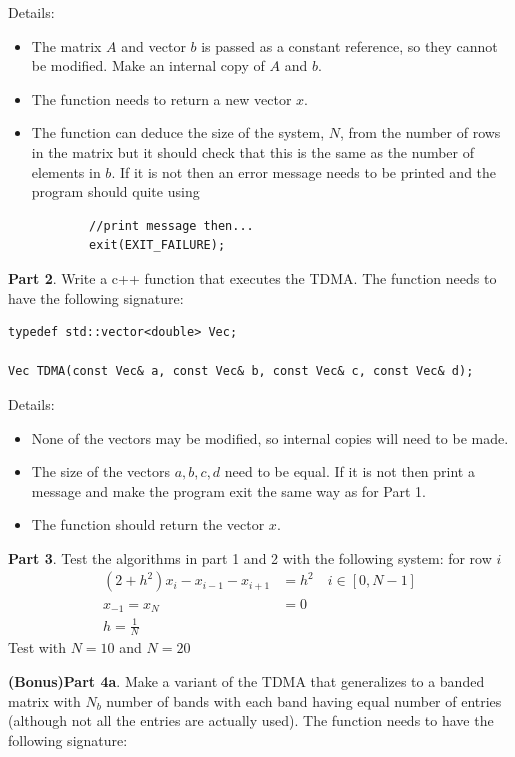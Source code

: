\documentclass[10pt,letterpaper,notitlepage]{article}
\newcommand{\beq}{\begin{equation*} \begin{aligned}}
\newcommand{\eeq}{\end{aligned}\end{equation*}}
\begin{document}
Details:
\begin{itemize}
	\item The matrix $A$ and vector $b$ is passed as a constant reference, so they cannot be modified. Make an internal copy of $A$ and $b$.
	\item The function needs to return a new vector $x$.
	\item The function can deduce the size of the system, $N$, from the number of rows
	in the matrix but it should check that this is the same as the number of elements in $b$. If it is not then an error message needs to be printed and the program should quite using 
	\begin{verbatim}
		//print message then...
		exit(EXIT_FAILURE);
	\end{verbatim}
\end{itemize}

\noindent
\textbf{Part 2}. Write a c++ function that executes the TDMA. The function needs to have the following signature:

\begin{verbatim}
typedef std::vector<double> Vec;

Vec TDMA(const Vec& a, const Vec& b, const Vec& c, const Vec& d);
\end{verbatim}

Details:
\begin{itemize}
	\item None of the vectors may be modified, so internal copies will need to be made.
	\item The size of the vectors $a,b,c,d$ need to be equal. If it is not then print a message and make the program exit the same way as for Part 1.
	\item The function should return the vector $x$.
\end{itemize}

\noindent
\textbf{Part 3}. Test the algorithms in part 1 and 2 with the following system:
for row $i$
\beq 
(2 + h^2)x_i - x_{i-1} - x_{i+1} &= h^2 \quad i\in [0,N-1]\\
x_{-1} = x_N &= 0\\
h = \frac{1}{N}
\eeq 
Test with $N=10$ and $N=20$

\vspace{1cm}
\noindent 
\textbf{(Bonus)Part 4a}. Make a variant of the TDMA that generalizes to a banded matrix with $N_b$ number of bands with each band having equal number of entries (although not all the entries are actually used). The function needs to have the following signature:
\end{document}
